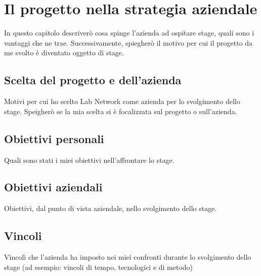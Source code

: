 
\chapter{Il progetto nella strategia aziendale}
\label{cap:processi-metodologie}

In questo capitolo descriverò cosa spinge l'azienda ad ospitare stage, quali sono i vantaggi che ne trae.
Successivamente, spiegherò il motivo per cui il progetto da me svolto è diventato oggetto di stage.
\section{Scelta del progetto e dell'azienda}
Motivi per cui ho scelto Lab Network come azienda per lo svolgimento dello stage.
Speigherò se la mia scelta si è focalizzata sul progetto o sull'azienda.

\section{Obiettivi personali}
Quali sono stati i miei obiettivi nell'affrontare lo stage.

\section{Obiettivi aziendali}
Obiettivi, dal punto di vista aziendale, nello svolgimento dello stage.

\section{Vincoli}
Vincoli che l'azienda ha imposto nei miei confronti durante lo svolgimento dello stage (ad esempio: vincoli di tempo, tecnologici e di metodo)
